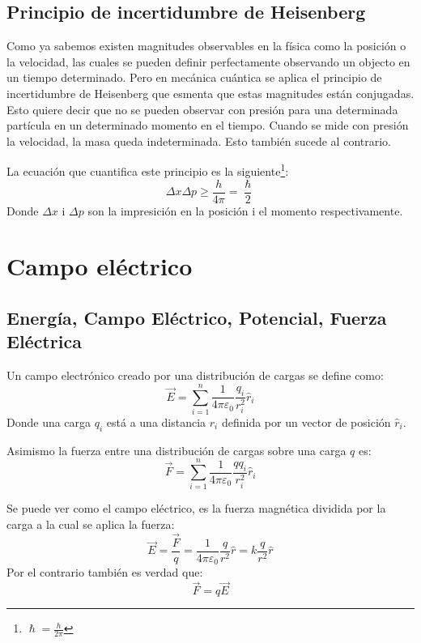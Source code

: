 \documentclass[arial,a4paper,print]{article}
\begin{document}
\subsection{Principio de incertidumbre de Heisenberg}
Como ya sabemos existen magnitudes observables en la física como la posición o la velocidad, las cuales se pueden definir perfectamente observando un objecto en un tiempo determinado. Pero en mecánica cuántica se aplica el principio de incertidumbre de Heisenberg que esmenta que estas magnitudes están conjugadas. Esto quiere decir que no se pueden observar con presión para una determinada partícula en un determinado momento en el tiempo. Cuando se mide con presión la velocidad, la masa queda indeterminada. Esto también sucede al contrario. 

La ecuación que cuantifica este principio es la siguiente\footnote{$\hslash = \frac{h}{2\pi}$}:
\begin{equation*}
	\Delta x\Delta p \geq \frac{h}{4\pi} = \frac{\hslash}{2}
\end{equation*}
Donde $\Delta x$ i $\Delta p$ son la impresición en la posición i el momento respectivamente.

\pagebreak
\section{Campo eléctrico}

\subsection{Energía, Campo Eléctrico, Potencial, Fuerza Eléctrica}
Un campo electrónico creado por una distribución de cargas se define como:
\begin{equation*}
	\overrightarrow{E} = \sum^{n}_{i=1}\frac{1}{4\pi\varepsilon_{0}}\frac{q_{i}}{r^{2}_{i}}\hat{r}_{i}
\end{equation*} 
Donde una carga $q_{i}$ está a una distancia $r_{i}$ definida por un vector de posición $\hat{r}_{i}$.

Asimismo la fuerza entre una distribución de cargas sobre una carga $q$ es:
\begin{equation*}
	\overrightarrow{F} = \sum_{i=1}^{n}\frac{1}{4\pi\varepsilon_{0}}\frac{qq_{i}}{r^{2}_{i}}\hat{r}_{i}
\end{equation*}

Se puede ver como el campo eléctrico, es la fuerza magnética dividida por la carga a la cual se aplica la fuerza:
\begin{equation*}
	\overrightarrow{E} = \frac{\overrightarrow{F}}{q} = \frac{1}{4\pi\varepsilon_{0}} \frac{q}{r^{2}}\hat{r} = k\frac{q}{r^2}\hat{r}
\end{equation*}
Por el contrario también es verdad que:
\begin{equation*}
	\overrightarrow{F} = q\overrightarrow{E}
\end{equation*}
\end{document}
